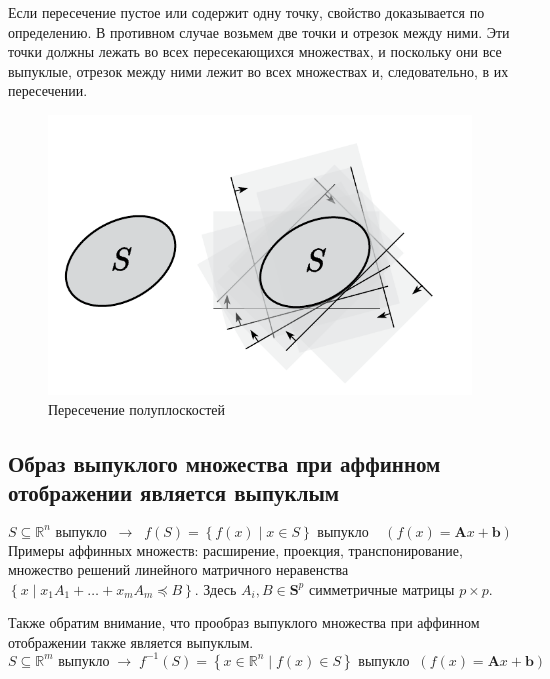 \documentclass[
  russian,
  letterpaper,
  DIV=11,
  numbers=noendperiod]{scrartcl}
\begin{document}
Если пересечение пустое или содержит одну точку, свойство доказывается
по определению. В противном случае возьмем две точки и отрезок между
ними. Эти точки должны лежать во всех пересекающихся множествах, и
поскольку они все выпуклые, отрезок между ними лежит во всех множествах
и, следовательно, в их пересечении.

\begin{figure}[H]

{\centering \includegraphics[width=0.5\linewidth,height=\textheight,keepaspectratio]{conv_inter.pdf}

}

\caption{Пересечение полуплоскостей}

\end{figure}%

\subsection{Образ выпуклого множества при аффинном отображении является
выпуклым}\label{ux43eux431ux440ux430ux437-ux432ux44bux43fux443ux43aux43bux43eux433ux43e-ux43cux43dux43eux436ux435ux441ux442ux432ux430-ux43fux440ux438-ux430ux444ux444ux438ux43dux43dux43eux43c-ux43eux442ux43eux431ux440ux430ux436ux435ux43dux438ux438-ux44fux432ux43bux44fux435ux442ux441ux44f-ux432ux44bux43fux443ux43aux43bux44bux43c}

\[
S \subseteq \mathbb{R}^n \text{ выпукло}\;\; \rightarrow \;\; f(S) = \left\{ f(x) \mid x \in S \right\} \text{ выпукло} \;\;\;\; \left(f(x) = \mathbf{A}x + \mathbf{b}\right)
\] Примеры аффинных множеств: расширение, проекция, транспонирование,
множество решений линейного матричного неравенства
\(\left\{ x \mid x_1 A_1 + \ldots + x_m A_m \preceq B\right\}\). Здесь
\(A_i, B \in \mathbf{S}^p\) симметричные матрицы \(p \times p\).

Также обратим внимание, что прообраз выпуклого множества при аффинном
отображении также является выпуклым. \[
S \subseteq \mathbb{R}^m \text{ выпукло}\; \rightarrow \; f^{-1}(S) = \left\{ x \in \mathbb{R}^n \mid f(x) \in S \right\} \text{ выпукло} \;\; \left(f(x) = \mathbf{A}x + \mathbf{b}\right)
\]
\end{document}
